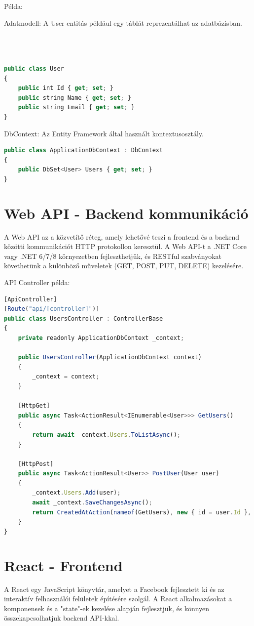 \documentclass[colorlinks]{thesis-kando}
\theoremstyle{definition}
\theoremstyle{remark}
\begin{document}
Példa:

Adatmodell: A User entitás például egy táblát reprezentálhat az adatbázisban.

\begin{lstlisting}[language=JavaScript]
	
	
	
public class User
{
	public int Id { get; set; }
	public string Name { get; set; }
	public string Email { get; set; }
}
\end{lstlisting}
DbContext: Az Entity Framework által használt kontextusosztály.

\begin{lstlisting}[language=JavaScript]
public class ApplicationDbContext : DbContext
{
	public DbSet<User> Users { get; set; }
}
\end{lstlisting}
\section {Web API - Backend kommunikáció}
A Web API az a közvetítő réteg, amely lehetővé teszi a frontend és a backend közötti kommunikációt HTTP protokollon keresztül. A Web API-t a .NET Core vagy .NET 6/7/8 környezetben fejleszthetjük, és RESTful szabványokat követhetünk a különböző műveletek (GET, POST, PUT, DELETE) kezelésére.

API Controller példa:
\begin{lstlisting}[language=JavaScript]
[ApiController]
[Route("api/[controller]")]
public class UsersController : ControllerBase
{
	private readonly ApplicationDbContext _context;
	
	public UsersController(ApplicationDbContext context)
	{
		_context = context;
	}
	
	[HttpGet]
	public async Task<ActionResult<IEnumerable<User>>> GetUsers()
	{
		return await _context.Users.ToListAsync();
	}
	
	[HttpPost]
	public async Task<ActionResult<User>> PostUser(User user)
	{
		_context.Users.Add(user);
		await _context.SaveChangesAsync();
		return CreatedAtAction(nameof(GetUsers), new { id = user.Id }, user);
	}
}
\end{lstlisting}
\section {React - Frontend}
A React egy JavaScript könyvtár, amelyet a Facebook fejlesztett ki és az interaktív felhasználói felületek építésére szolgál. A React alkalmazásokat a komponensek és a "state"-ek kezelése alapján fejlesztjük, és könnyen összekapcsolhatjuk backend API-kkal.
\end{document}
